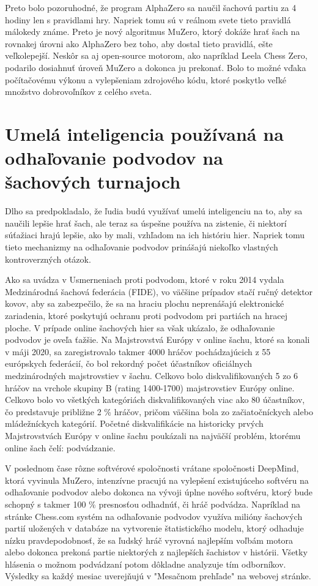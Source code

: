 \documentclass[10pt,twoside,slovak,a4paper]{article}
\begin{document}
Preto bolo pozoruhodné, že program AlphaZero sa naučil šachovú partiu za 4 hodiny len s pravidlami hry. Napriek tomu sú v reálnom svete tieto pravidlá málokedy známe. Preto je nový algoritmus MuZero, ktorý dokáže hrať šach na rovnakej úrovni ako AlphaZero bez toho, aby dostal tieto pravidlá, ešte veľkolepejší. Neskôr sa aj open-source motorom, ako napríklad Leela Chess Zero, podarilo dosiahnuť úroveň MuZero a dokonca ju prekonať. Bolo to možné vďaka počítačovému výkonu a vylepšeniam zdrojového kódu, ktoré poskytlo veľké množstvo dobrovoľníkov z celého sveta.






\section{Umelá inteligencia používaná na odhaľovanie podvodov na šachových turnajoch}

Dlho sa predpokladalo, že ľudia budú využívať umelú inteligenciu na to, aby sa naučili lepšie hrať šach, ale teraz sa úspešne používa na zistenie, či niektorí súťažiaci hrajú lepšie, ako by mali, vzhľadom na ich históriu hier. Napriek tomu tieto mechanizmy na odhaľovanie podvodov prinášajú niekoľko vlastných kontroverzných otázok.

Ako sa uvádza v Usmerneniach proti podvodom, ktoré v roku 2014 vydala Medzinárodná šachová federácia (FIDE), vo väčšine prípadov stačí ručný detektor kovov, aby sa zabezpečilo, že sa na hraciu plochu neprenášajú elektronické zariadenia, ktoré poskytujú ochranu proti podvodom pri partiách na hracej ploche. V prípade online šachových hier sa však ukázalo, že odhaľovanie podvodov je oveľa ťažšie. Na Majstrovstvá Európy v online šachu, ktoré sa konali v máji 2020, sa zaregistrovalo takmer 4000 hráčov pochádzajúcich z 55 európskych federácií, čo bol rekordný počet účastníkov oficiálnych medzinárodných majstrovstiev v šachu. Celkovo bolo diskvalifikovaných 5 zo 6 hráčov na vrchole skupiny B (rating 1400-1700) majstrovstiev Európy online. Celkovo bolo vo všetkých kategóriách diskvalifikovaných viac ako 80 účastníkov, čo predstavuje približne 2 \% hráčov, pričom väčšina bola zo začiatočníckych alebo mládežníckych kategórií. Početné diskvalifikácie na historicky prvých Majstrovstvách Európy v online šachu poukázali na najväčší problém, ktorému online šach čelí: podvádzanie.

V poslednom čase rôzne softvérové spoločnosti vrátane spoločnosti DeepMind, ktorá vyvinula MuZero, intenzívne pracujú na vylepšení existujúceho softvéru na odhaľovanie podvodov alebo dokonca na vývoji úplne nového softvéru, ktorý bude schopný s takmer 100 \% presnosťou odhadnúť, či hráč podvádza. Napríklad na stránke Chess.com systém na odhaľovanie podvodov využíva milióny šachových partií uložených v databáze na vytvorenie štatistického modelu, ktorý odhaduje nízku pravdepodobnosť, že sa ľudský hráč vyrovná najlepším voľbám motora alebo dokonca prekoná partie niektorých z najlepších šachistov v histórii. Všetky hlásenia o možnom podvádzaní potom dôkladne analyzuje tím odborníkov. Výsledky sa každý mesiac uverejňujú v "Mesačnom prehľade" na webovej stránke.
\end{document}
